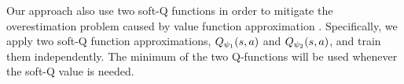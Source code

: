 Our approach also use two soft-Q functions in order to mitigate the overestimation problem caused by value function approximation \citep{haarnoja2018soft,fujimoto2018addressing}. Specifically, we apply two soft-Q function approximations, $Q_{\psi_1}(s,a)$ and $Q_{\psi_2}(s,a)$, and train them independently.  The minimum of the two Q-functions will be used whenever the soft-Q value is needed. 















